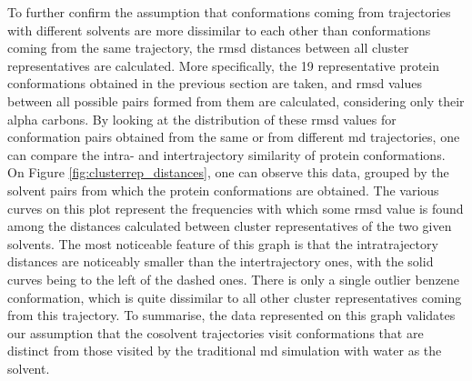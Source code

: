 To further confirm the assumption that conformations coming from trajectories with different solvents are more dissimilar to each other than conformations coming from the same trajectory, the \gls{rmsd} distances between all cluster representatives are calculated.
More specifically, the 19 representative protein conformations obtained in the previous section are taken, and \gls{rmsd} values between all possible pairs formed from them are calculated, considering only their alpha carbons.
By looking at the distribution of these \gls{rmsd} values for conformation pairs obtained from the same or from different \gls{md} trajectories, one can compare the intra- and intertrajectory similarity of protein conformations.
On Figure \ref{fig:clusterrep_distances}, one can observe this data, grouped by the solvent pairs from which the protein conformations are obtained.
The various curves on this plot represent the frequencies with which some \gls{rmsd} value is found among the distances calculated between cluster representatives of the two given solvents.
The most noticeable feature of this graph is that the intratrajectory distances are noticeably smaller than the intertrajectory ones, with the solid curves being to the left of the dashed ones.
There is only a single outlier benzene conformation, which is quite dissimilar to all other cluster representatives coming from this trajectory.
To summarise, the data represented on this graph validates our assumption that the cosolvent trajectories visit conformations that are distinct from those visited by the traditional \gls{md} simulation with water as the solvent.
